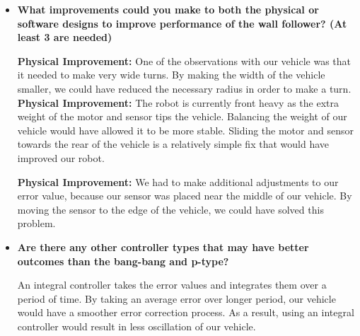 \documentclass[paper=a4, fontsize=11pt]{scrartcl}
\begin{document}
\begin{itemize}
  \item \textbf{What improvements could you make to both the physical or software designs to improve performance of the wall follower? (At least 3 are needed)}
  
  \textbf{Physical Improvement:} One of the observations with our vehicle was that it needed to make very wide turns. By making the width of the vehicle smaller, we could have reduced the necessary radius in order to make a turn.   
  \\ \textbf{Physical Improvement:} The robot is currently front heavy as the extra weight of the motor and sensor tips the vehicle. Balancing the weight of our vehicle would have allowed it to be more stable. Sliding the motor and sensor towards the rear of the vehicle is a relatively simple fix that would have improved our robot.    
  
  \textbf{Physical Improvement:} We had to make additional adjustments to our error value, because our sensor was placed near the middle of our vehicle. By moving the sensor to the edge of the vehicle, we could have solved this problem.
  
  \item \textbf{Are there any other controller types that may have better outcomes than the bang-bang and p-type?}
  
  An integral controller takes the error values and integrates them over a period of time. By taking an average error over longer period, our vehicle would have a smoother error correction process. As a result, using an integral controller would result in less oscillation of our vehicle.
  
\end{itemize}
\end{document}
